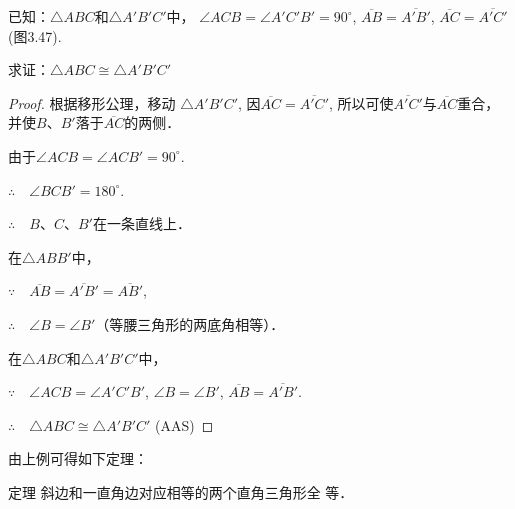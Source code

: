 \begin{example}
    已知：$\triangle ABC$和$\triangle A'B'C'$中，
$\angle ACB=\angle A'C'B'=90^{\circ}$, $\overline{AB}=\overline{A'B'}$,
$\overline{AC}=\overline{A'C'}$ (图3.47).

求证：$\triangle ABC\cong \triangle A'B'C'$
\end{example}

\begin{proof}
    根据移形公理，移动
$\triangle A'B'C'$, 因$\overline{AC}=\overline{A'C'}$,
所以可使$\overline{A'C'}$与$\overline{AC}$重合，
并使$B$、$B'$落于$\overline{AC}$的两侧．

由于$\angle ACB=\angle ACB'=90^{\circ}$.

$\therefore\quad \angle  BCB'=180^{\circ}$.

$\therefore\quad B$、$C$、$B'$在一条直线上．

在$\triangle ABB'$中，

$\because\quad \overline{AB}=\overline{A'B'}=\overline{AB'}$,

$\therefore\quad \angle B=\angle B'$（等腰三角形的两底角相等）．

在$\triangle ABC$和$\triangle A'B'C'$中，

$\because\quad \angle ACB=\angle A'C'B'$, $\angle B=\angle B'$, $\overline{AB}=\overline{A'B'}$.

$\therefore\quad \triangle ABC\cong \triangle A'B'C'$ (AAS)    
\end{proof}

由上例可得如下定理：

\begin{blk}
  {定理} 斜边和一直角边对应相等的两个直角三角形全
等．  
\end{blk}

